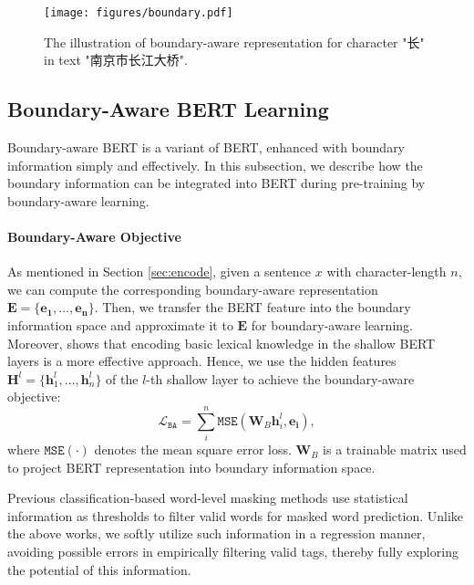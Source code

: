 \documentclass[11pt]{article}
\begin{document}
\begin{CJK}{UTF8}{gbsn}
\begin{figure}
  \centering
  \texttt{[image: figures/boundary.pdf]}
  \caption{The illustration of boundary-aware representation for character "长" in text "南京市长江大桥".}
  \label{fig:boundary}
\end{figure}

\subsection{Boundary-Aware BERT Learning}
\label{sec:bound-learning}
Boundary-aware BERT is a variant of BERT, enhanced with boundary information simply and effectively.
In this subsection, we describe how the boundary information can be integrated into BERT during pre-training by boundary-aware learning.



\paragraph{Boundary-Aware Objective}


As mentioned in Section \ref{sec:encode}, given a sentence $x$ with character-length $n$, we can compute the corresponding boundary-aware representation $\mathbf{E} = \{\mathbf{e_1}, ..., \mathbf{e_n}  \}$.
Then, we transfer the BERT feature into the boundary information space and approximate it to $\mathbf{E}$ for boundary-aware learning.
Moreover, \citet{liu-etal-2021-lexicon} shows that encoding basic lexical knowledge in the shallow BERT layers is a more effective approach.
Hence, we use the hidden features $\mathbf{H}^l = \{\mathbf{h}^l_1, ..., \mathbf{h}^l_n\}$ of the $l$-th shallow layer to achieve the boundary-aware objective:
\begin{equation}
  \label{eq:BA}
\mathcal{L}_\texttt{BA} = {\sum}_{i}^n \texttt{MSE}(\mathbf{W}_{B} \mathbf{h}^l_i, \mathbf{e_i}),
\end{equation}
where $\mathtt{MSE}(\cdot)$ denotes the mean square error loss.
$\mathbf{W}_{B}$ is a trainable matrix used to project BERT representation into boundary information space.


Previous classification-based word-level masking methods use statistical information as thresholds to filter valid words for masked word prediction.
Unlike the above works, we softly utilize such information in a regression manner,
avoiding possible errors in empirically filtering valid tags,
thereby fully exploring the potential of this information.




\end{CJK}
\end{document}
